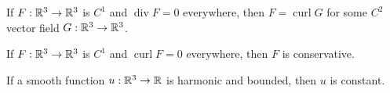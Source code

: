 \documentclass{homework}
\begin{document}
\begin{problem}
  If $F:\mathbb{R}^3\to\mathbb{R}^3$ is $C^1$ and $\operatorname{div} F = 0$ everywhere, then $F = \operatorname{curl} G$ for some $C^2$ vector field $G:\mathbb{R}^3\to\mathbb{R}^3$.
\end{problem}

\begin{problem}
  If $F:\mathbb{R}^3\to\mathbb{R}^3$ is $C^1$ and $\operatorname{curl} F = 0$ everywhere, then $F$ is conservative.
\end{problem}

\begin{problem}
  If a smooth function $u:\mathbb{R}^3\to\mathbb{R}$ is harmonic and bounded, then $u$ is constant.
\end{problem}
\end{document}

